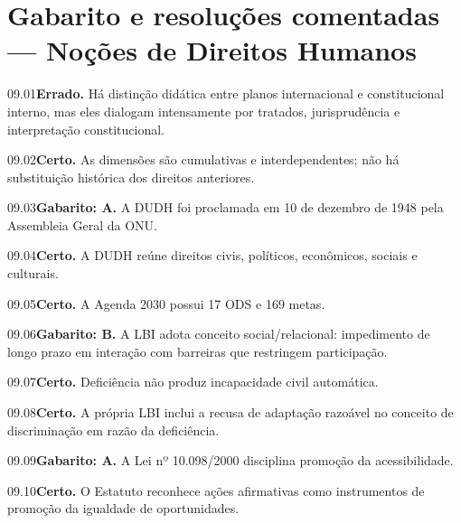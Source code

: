\section{Gabarito e resoluções comentadas — Noções de Direitos Humanos}

\begin{solucao}{09.01}\textbf{Errado.} Há distinção didática entre planos internacional e constitucional interno, mas eles dialogam intensamente por tratados, jurisprudência e interpretação constitucional.\end{solucao}
\begin{solucao}{09.02}\textbf{Certo.} As dimensões são cumulativas e interdependentes; não há substituição histórica dos direitos anteriores.\end{solucao}
\begin{solucao}{09.03}\textbf{Gabarito: A.} A DUDH foi proclamada em 10 de dezembro de 1948 pela Assembleia Geral da ONU.\end{solucao}
\begin{solucao}{09.04}\textbf{Certo.} A DUDH reúne direitos civis, políticos, econômicos, sociais e culturais.\end{solucao}
\begin{solucao}{09.05}\textbf{Certo.} A Agenda 2030 possui 17 ODS e 169 metas.\end{solucao}
\begin{solucao}{09.06}\textbf{Gabarito: B.} A LBI adota conceito social/relacional: impedimento de longo prazo em interação com barreiras que restringem participação.\end{solucao}
\begin{solucao}{09.07}\textbf{Certo.} Deficiência não produz incapacidade civil automática.\end{solucao}
\begin{solucao}{09.08}\textbf{Certo.} A própria LBI inclui a recusa de adaptação razoável no conceito de discriminação em razão da deficiência.\end{solucao}
\begin{solucao}{09.09}\textbf{Gabarito: A.} A Lei nº 10.098/2000 disciplina promoção da acessibilidade.\end{solucao}
\begin{solucao}{09.10}\textbf{Certo.} O Estatuto reconhece ações afirmativas como instrumentos de promoção da igualdade de oportunidades.\end{solucao}

